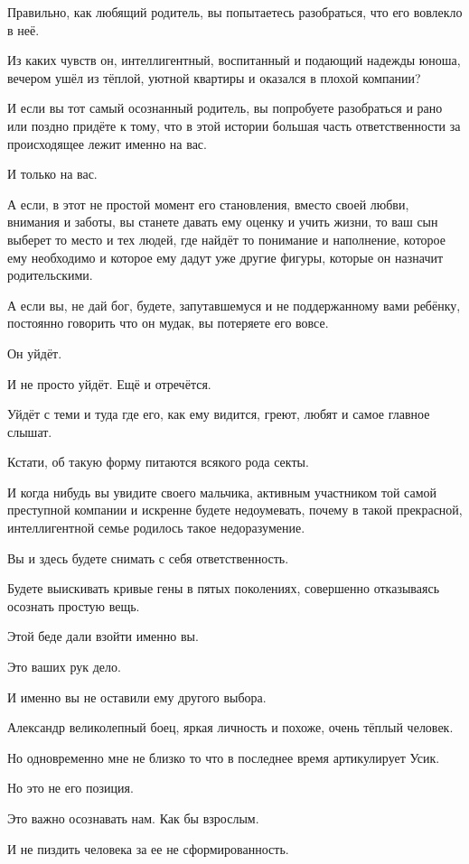 Правильно, как любящий родитель, вы попытаетесь разобраться, что его вовлекло в
неё. 

Из каких чувств он,  интеллигентный, воспитанный и подающий надежды юноша,
вечером ушёл из тёплой, уютной квартиры и оказался  в плохой компании? 

И если вы тот самый осознанный родитель, вы попробуете разобраться и рано или
поздно придёте к тому, что в этой истории большая часть ответственности за
происходящее лежит именно на вас. 

И только на вас.

А если, в этот не простой момент его становления, вместо своей любви, внимания
и заботы,  вы станете давать ему оценку и учить жизни, то ваш сын выберет то
место и тех людей, где найдёт то понимание и наполнение, которое ему необходимо
и которое ему дадут уже другие фигуры, которые он назначит родительскими.

А если вы, не дай бог,  будете, запутавшемуся и не поддержанному вами ребёнку,
постоянно говорить что он мудак, вы потеряете его вовсе.

Он уйдёт. 

И не просто уйдёт. Ещё и отречётся.

Уйдёт с теми и туда где его, как ему видится, греют, любят и самое главное
слышат. 

Кстати, об такую форму питаются всякого рода секты.

И когда нибудь вы увидите своего мальчика, активным участником той самой
преступной компании и искренне будете недоумевать, почему в такой прекрасной,
интеллигентной семье родилось такое недоразумение.

Вы и здесь будете снимать с себя ответственность.

Будете выискивать кривые гены в пятых поколениях, совершенно отказываясь
осознать простую вещь.

Этой беде дали взойти именно вы. 

Это ваших рук дело.

И именно вы не оставили ему другого выбора.

Александр великолепный боец, яркая личность и похоже, очень тёплый человек. 

Но одновременно мне не близко то что в последнее время артикулирует Усик.

Но это не его позиция. 

Это важно осознавать нам. Как бы взрослым. 

И не пиздить человека за ее не сформированность. 


